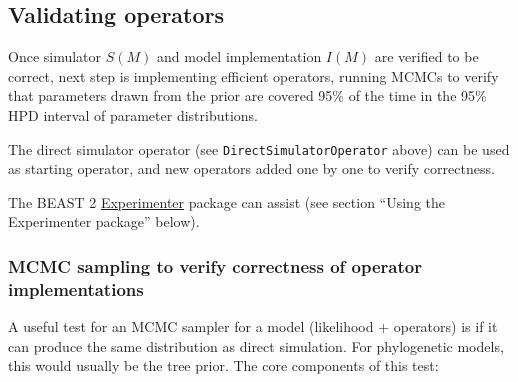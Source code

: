 \documentclass[oneside]{article}
\begin{document}
\subsection{Validating operators}

Once simulator \(S(M)\) and model implementation \(I(M)\) are verified
to be correct, next step is implementing efficient operators, running
MCMCs to verify that parameters drawn from the prior are covered 95\% of
the time in the 95\% HPD interval of parameter distributions.

The direct simulator operator (see \texttt{DirectSimulatorOperator}
above) can be used as starting operator, and new operators added one by
one to verify correctness.

The BEAST 2
\href{https://github.com/rbouckaert/Experimenter}{Experimenter} package
can assist (see section ``Using the Experimenter package'' below).

\subsubsection{MCMC sampling to verify correctness of operator
implementations}\label{mcmc-sampling-to-verify-correctness-of-operator-implementations}

A useful test for an MCMC sampler for a model (likelihood + operators)
is if it can produce the same distribution as direct simulation. For
phylogenetic models, this would usually be the tree prior. The core
components of this test:
\end{document}
